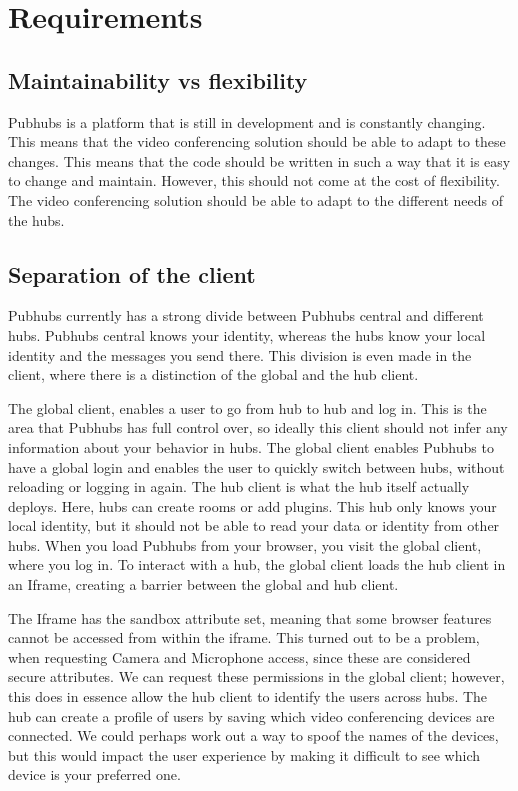 \documentclass{report}
\begin{document}
    \chapter{Requirements}

    \section{Maintainability vs flexibility}
    Pubhubs is a platform that is still in development and is constantly changing. This means that the video conferencing
    solution should be able to adapt to these changes. This means that the code should be written in such a way that it
    is easy to change and maintain. However, this should not come at the cost of flexibility. The video conferencing
    solution should be able to adapt to the different needs of the hubs.




    \section{Separation of the client}
    Pubhubs currently has a strong divide between Pubhubs central and different hubs. Pubhubs central knows your
    identity, whereas the hubs know your local identity and the messages you send there. This division is even made in
    the client, where there is a distinction of the global and the hub client.

    The global client, enables a user to go from hub to hub and log in. This is the area that Pubhubs has full control
    over, so ideally this client should not infer any information about your behavior in hubs. The global client enables
    Pubhubs to have a global login and enables the user to quickly switch between hubs, without reloading or logging in
    again. The hub client is what the hub itself actually deploys. Here, hubs can create rooms or add plugins. This hub
    only knows your local identity, but it should not be able to read your data or identity from other hubs. When you
    load Pubhubs from your browser, you visit the global client, where you log in. To interact with a hub, the global
    client loads the hub client in an Iframe, creating a barrier between the global and hub client.

    The Iframe has the sandbox attribute set, meaning that some browser features cannot be accessed from within the
    iframe. This turned out to be a problem, when requesting Camera and Microphone access, since these are considered
    secure attributes. We can request these permissions in the global client; however, this does in essence allow the
    hub client to identify the users across hubs. The hub can create a profile of users by saving which video
    conferencing devices are connected. We could perhaps work out a way to spoof the names of the devices, but this
    would impact the user experience by making it difficult to see which device is your preferred one.
\end{document}
